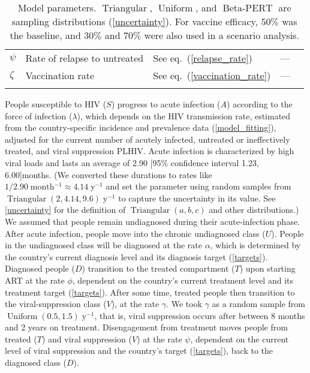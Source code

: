 \documentclass{article}
\DeclareMathOperator{\Uniform}{Uniform}
\DeclareMathOperator{\Triangular}{Triangular}
\DeclareMathOperator{\BetaPERT}{Beta-PERT}
\begin{document}
\begin{table}
\begin{center}
\begin{tabularx}{\textwidth}{lXlll}
      $\psi$ & Rate of relapse to untreated & See eq.~(\ref{relapse_rate})
      & --- \\
      $\zeta$ & Vaccination rate & See eq.~(\ref{vaccination_rate}) & --- \\
      \hline
      \vspace*{-2.5em}
    \end{tabularx}
    \caption{Model parameters. $\Triangular$, $\Uniform$, and
      $\BetaPERT$ are sampling distributions (\autoref{uncertainty}).
      For vaccine efficacy, $50\%$ was the baseline, and $30\%$ and
      $70\%$ were also used in a scenario analysis.}
    \label{model_param}
  \end{center}
\end{table}

People susceptible to HIV ($S$) progress to acute infection ($A$)
according to the force of infection ($\lambda$), which depends on the
HIV transmission rate, estimated from the country-specific incidence
and prevalence data (\autoref{model_fitting}), adjusted for the
current number of acutely infected, untreated or ineffectively
treated, and viral suppression PLHIV.  Acute infection is
characterized by high viral loads and lasts an average of 2.90 [95\%
confidence interval 1.23, 6.00]\;months\cite{Hollingsworth2008-iy}.
(We converted these durations to rates like
$1 / 2.90\;\text{month$^{-1}$} \approx 4.14\;\text{y$^{-1}$}$ and set
the parameter using random samples from
$\Triangular(2, 4.14, 9.6)\;\text{y$^{-1}$}$ to capture the
uncertainty in its value.  See \autoref{uncertainty} for the
definition of $\Triangular(a, b, c)$ and other distributions.)  We
assumed that people remain undiagnosed during their acute-infection
phase. After acute infection, people move into the chronic undiagnosed
class ($U$).  People in the undiagnosed class will be diagnosed at the
rate $\alpha$, which is determined by the country's current diagnosis
level and its diagnosis target (\autoref{targets}).  Diagnosed people
($D$) transition to the treated compartment ($T$) upon starting ART at
the rate $\phi$, dependent on the country's current treatment level
and its treatment target (\autoref{targets}).  After some time,
treated people then transition to the viral-suppression class ($V$),
at the rate $\gamma$.  We took $\gamma$ as a random sample from
$\Uniform(0.5, 1.5)\;\text{y$^{-1}$}$, that is, viral suppression
occurs after between 8 months and 2 years on
treatment\cite{Currie2009-yz}.  Disengagement from treatment moves
people from treated ($T$) and viral suppression ($V$) at the rate
$\psi$, dependent on the current level of viral suppression and the
country's target (\autoref{targets}), back to the diagnosed class
($D$).
\end{document}
